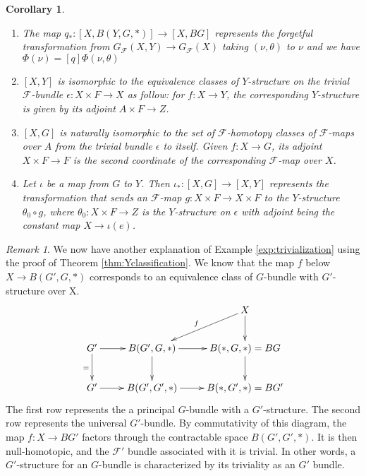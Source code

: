 \documentclass[psamsfonts]{amsart}
\newtheorem{cor}[thm]{Corollary}
\theoremstyle{definition}
\theoremstyle{remark}
\newtheorem{rem}[thm]{Remark}
\numberwithin{equation}{section}
\begin{document}
\begin{cor}
\leavevmode
\begin{enumerate}
\item The map $q_{*}: [X, B(Y, G, *)] \to [X, BG]$ represents the forgetful transformation from $G_{\mathcal{F}}(X, Y) \to G_{\mathcal{F}}(X)$ taking $(\nu, \theta)$ to $\nu$ and we have $\Phi(\nu) = [q]\Phi{(\nu, \theta)}$
\item $[X,Y]$ is isomorphic to the equivalence classes of $Y$-structure on the trivial $\mathcal{F}$-bundle $\epsilon: X \times F \to X$ as follow: for $f: X \to Y$, the corresponding $Y$-structure is given by its adjoint $A \times F \to Z$.
\item $[X, G]$ is naturally isomorphic to the set of $\mathcal{F}$-homotopy classes of $\mathcal{F}$-maps over $A$ from the trivial bundle $\epsilon$ to itself. Given $f: X \to G$, its adjoint $X \times F \to F$ is the second coordinate of the corresponding $\mathcal{F}$-map over $X$.
\item Let $\iota$ be a map from $G$ to $Y$. Then $\iota_{*}: [X, G] \to [X, Y]$ represents the transformation that sends an $\mathcal{F}$-map $g: X \times F \to X \times F$ to the $Y$-structure $\theta_{0} \circ g$, where $\theta_{0}: X \times F \to Z$ is the $Y$-structure on $\epsilon$ with adjoint being the constant map $X \to \iota(e)$. 
\end{enumerate}

\end{cor}



\begin{rem}
We now have another explanation of Example \ref{exp:trivialization} using the proof of Theorem \ref{thm:Yclassification}. We know that the map $f$ below $X \to B(G', G, *)$ corresponds to an equivalence class of $G$-bundle with $G'$-structure over X.
\[\xymatrix{
& & X \ar[d] \ar[dl]_{f}\\
G' \ar[d]_{=} \ar[r] & B(G', G, *) \ar[d] \ar[r] & B(*, G, *) = BG \ar[d]\\
G' \ar[r] & B(G', G', *) \ar[r] & B(*, G', *) = BG' \\} \]
The first row represents the a principal $G$-bundle with a $G'$-structure. The second row represents the universal $G'$-bundle. By commutativity of this diagram, the map $f: X \to BG'$ factors through the contractable space $B(G', G', *)$. It is then null-homotopic, and the $\mathcal{F'}$ bundle associated with it is trivial.
In other words, a $G'$-structure for an $G$-bundle is characterized by its triviality as an $G'$ bundle. 
\end{rem}
\end{document}
